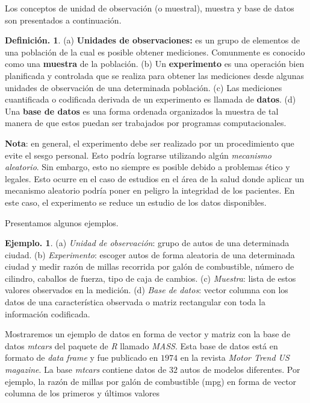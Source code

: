 \documentclass[]{book}
\theoremstyle{definition}
\newtheorem{definition}{Definición.}[chapter]
\theoremstyle{definition}
\newtheorem{example}{Ejemplo.}[chapter]
\theoremstyle{definition}
\theoremstyle{remark}
\begin{document}
Los conceptos de unidad de observación (o
muestral),
muestra y base de datos son presentados a
continuación.

\begin{definition}
\protect\hypertarget{def:unnamed-chunk-41}{}{\label{def:unnamed-chunk-41} }(a) \textbf{Unidades de observaciones:} es un grupo de
elementos de una población de la cual es
posible obtener mediciones.
Comunmente es conocido como una \textbf{muestra} de la población.
(b) Un \textbf{experimento} es una operación bien
planificada y controlada que se realiza para
obtener las mediciones desde algunas unidades de
observación de una determinada población. (c) Las
mediciones cuantificada o codificada derivada de
un experimento es llamada de \textbf{datos}. (d)
Una \textbf{base de datos} es una forma ordenada
organizados la muestra de tal manera de que estos
puedan
ser trabajados por programas
computacionales.
\end{definition}

\textbf{Nota}: en general, el experimento debe ser
realizado
por un procedimiento que evite el sesgo
personal. Esto podría lograrse utilizando algún
\emph{mecanismo aleatorio}. Sin embargo, esto no
siempre es posible debido a problemas ético y
legales.
Esto ocurre en el caso de estudios en el
área de la salud donde aplicar un mecanismo
aleatorio
podría poner en peligro la integridad de los
pacientes. En este caso, el experimento se reduce un
estudio de los datos disponibles.

Presentamos algunos ejemplos.

\begin{example}
\protect\hypertarget{exm:unnamed-chunk-42}{}{\label{exm:unnamed-chunk-42} }(a) \emph{Unidad de observación}: grupo de autos de una
determinada ciudad. (b) \emph{Experimento}: escoger
autos de forma aleatoria de una determinada ciudad y
medir razón de millas recorrida por galón de
combustible, número de cilindro, caballos de fuerza, tipo
de caja de cambios. (c) \emph{Muestra}: lista de estos valores
observados en la medición. (d) \emph{Base de datos}: vector
columna con los datos de
una característica observada o matriz rectangular con
toda la información codificada.
\end{example}

Mostraremos un ejemplo de datos en forma de vector y
matriz con la base de datos \emph{mtcars} del
paquete de \emph{R} llamado \emph{MASS}. Esta base de datos está en
formato de \emph{data frame} y fue publicado
en \(1974\) en la revista \emph{Motor Trend US magazine}. La
base \emph{mtcars} contiene datos de \(32\) autos
de modelos diferentes. Por ejemplo, la razón de millas
por galón de combustible (mpg) en forma de
vector columna de los primeros y últimos valores
\end{document}
